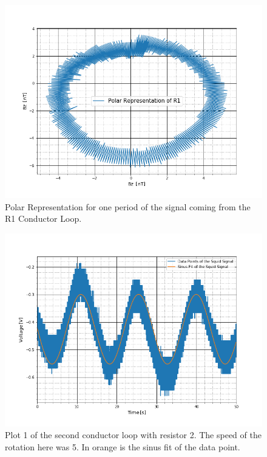 \begin{figure}[ht]
	\includegraphics[scale=0.5]{Bild/R1}
	\centering
	\caption[Polar Representation for R1 Conductor Loop]{Polar Representation for one period of the signal coming from the R1 Conductor Loop.}
\end{figure}
\begin{figure}[ht]
	\includegraphics[scale=0.5]{Bild/r2_5_1}
	\centering
	\caption[Plot of second conductor loop 1]{Plot 1 of the second conductor loop with resistor 2. The speed of the rotation here was 5. In orange is the sinus fit of the data point.}
\end{figure}

